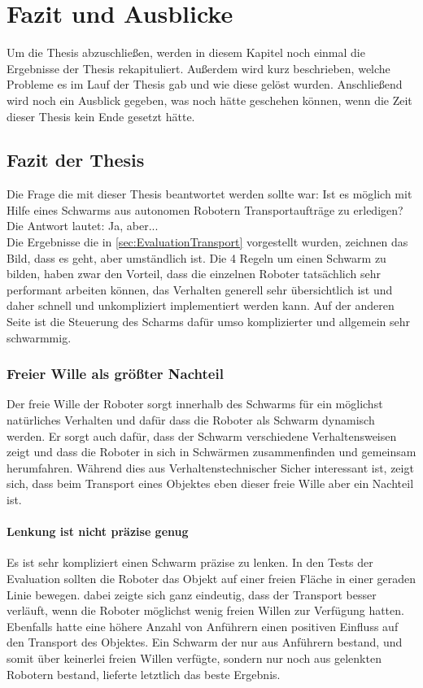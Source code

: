 \chapter{Fazit und Ausblicke}

Um die Thesis abzuschließen, werden in diesem Kapitel noch einmal die Ergebnisse der Thesis rekapituliert. Außerdem wird kurz beschrieben, welche Probleme es im Lauf der Thesis gab und wie diese gelöst wurden. Anschließend wird noch ein Ausblick gegeben, was noch hätte geschehen können, wenn die Zeit dieser Thesis kein Ende gesetzt hätte.

\section{Fazit der Thesis}

Die Frage die mit dieser Thesis beantwortet werden sollte war: Ist es möglich mit Hilfe eines Schwarms aus autonomen Robotern Transportaufträge zu erledigen? Die Antwort lautet: Ja, aber...\\

Die Ergebnisse die in \autoref{sec:EvaluationTransport} vorgestellt wurden, zeichnen das Bild, dass es geht, aber umständlich ist. Die 4 Regeln um einen Schwarm zu bilden, haben zwar den Vorteil, dass die einzelnen Roboter tatsächlich sehr performant arbeiten können, das Verhalten generell sehr übersichtlich ist und daher schnell und unkompliziert implementiert werden kann. Auf der anderen Seite ist die Steuerung des Scharms dafür umso komplizierter und allgemein sehr schwarmmig.

\subsection*{Freier Wille als größter Nachteil}
Der freie Wille der Roboter sorgt innerhalb des Schwarms für ein möglichst natürliches Verhalten und dafür dass die Roboter als Schwarm dynamisch werden. Er sorgt auch dafür, dass der Schwarm verschiedene Verhaltensweisen zeigt und dass die Roboter in sich in Schwärmen zusammenfinden und gemeinsam herumfahren. Während dies aus Verhaltenstechnischer Sicher interessant ist, zeigt sich, dass beim Transport eines Objektes eben dieser freie Wille aber ein Nachteil ist.

\subsubsection*{Lenkung ist nicht präzise genug}
Es ist sehr kompliziert einen Schwarm präzise zu lenken. In den Tests der Evaluation sollten die Roboter das Objekt auf einer freien Fläche in einer geraden Linie bewegen. dabei zeigte sich ganz eindeutig, dass der Transport besser verläuft, wenn die Roboter möglichst wenig freien Willen zur Verfügung hatten. Ebenfalls hatte eine höhere Anzahl von Anführern einen positiven Einfluss auf den Transport des Objektes. Ein Schwarm der nur aus Anführern bestand, und somit über keinerlei freien Willen verfügte, sondern nur noch aus gelenkten Robotern bestand, lieferte letztlich das beste Ergebnis.

